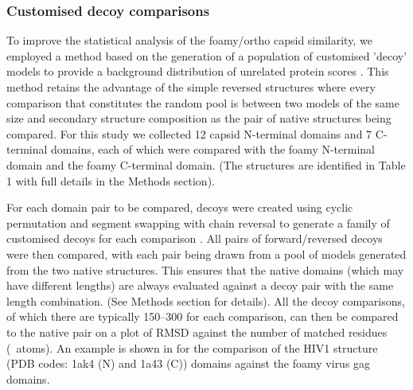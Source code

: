 \subsubsection{Customised decoy comparisons}

To improve the statistical analysis of the foamy/ortho capsid similarity, we employed a method
based on the generation of a population of customised 'decoy' models to provide a background distribution
of unrelated protein scores \cite{TaylorWR06a}.  This method retains the advantage of the simple
reversed structures where every comparison that constitutes the random pool is between two models
of the same size and secondary structure composition as the pair of native structures being compared.
For this study we collected 12 capsid N-terminal domains and 7 C-terminal domains, each of which 
were compared with the foamy N-terminal domain and the foamy C-terminal domain.
(The structures are identified in Table 1 with full details in the Methods section).

For each domain pair to be compared, decoys were created using cyclic permutation and segment
swapping with chain reversal to generate a family of customised decoys for each comparison
\cite{TaylorWR06a}.  All pairs of forward/reversed decoys were then compared, with each pair being
drawn from a pool of models generated from the two native structures.  This ensures that the native
domains (which may have different lengths) are always evaluated against a decoy pair with the same
length combination.   (See Methods section for details).   All the decoy comparisons, of which
there are typically 150--300 for each comparison,  can then be compared to the native pair on a
plot of RMSD against the number of matched residues (\CA\ atoms).   An example is shown in
 for the comparison of the HIV1 structure (PDB codes: 1ak4 (N) and 1a43 (C)) domains
against the foamy virus gag domains.
 
